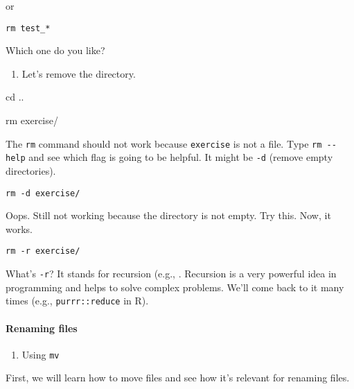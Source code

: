 \documentclass[
]{book}
\newenvironment{Shaded}{\begin{snugshade}}{\end{snugshade}}
\newcommand{\BuiltInTok}[1]{#1}
\newcommand{\FunctionTok}[1]{\textcolor[rgb]{0.00,0.00,0.00}{#1}}
\newcommand{\NormalTok}[1]{#1}
\providecommand{\tightlist}{%
  \setlength{\itemsep}{0pt}\setlength{\parskip}{0pt}}
\begin{document}
or

\begin{verbatim}
rm test_*
\end{verbatim}

Which one do you like?

\begin{enumerate}
\def\labelenumi{\arabic{enumi}.}
\setcounter{enumi}{3}
\tightlist
\item
  Let's remove the directory.
\end{enumerate}

\begin{Shaded}
\begin{Highlighting}[]

\BuiltInTok{cd}\NormalTok{ .. }

\FunctionTok{rm}\NormalTok{ exercise/}
\end{Highlighting}
\end{Shaded}

The \texttt{rm} command should not work because \texttt{exercise} is not a file. Type \texttt{rm\ -\/-help} and see which flag is going to be helpful. It might be \texttt{-d} (remove empty directories).

\begin{verbatim}
rm -d exercise/  
\end{verbatim}

Oops. Still not working because the directory is not empty. Try this. Now, it works.

\begin{verbatim}
rm -r exercise/ 
\end{verbatim}

What's \texttt{-r}? It stands for recursion (e.g., . Recursion is a very powerful idea in programming and helps to solve complex problems. We'll come back to it many times (e.g., \texttt{purrr::reduce} in R).

\hypertarget{renaming-files}{%
\paragraph{Renaming files}\label{renaming-files}}

\begin{enumerate}
\def\labelenumi{\arabic{enumi}.}
\tightlist
\item
  Using \texttt{mv}
\end{enumerate}

First, we will learn how to move files and see how it's relevant for renaming files.
\end{document}
